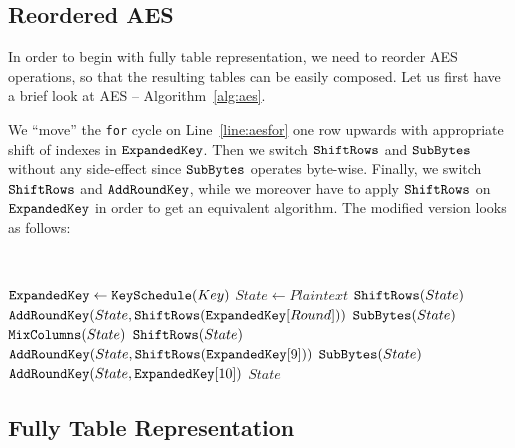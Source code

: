 
\subsection{Reordered AES}

In order to begin with fully table representation, we need to reorder AES operations, so that the resulting tables can be easily composed. Let us first have a brief look at AES -- Algorithm~\ref{alg:aes}.

We ``move'' the {\tt for} cycle on Line~\ref{line:aesfor} one row upwards with appropriate shift of indexes in $\texttt{ExpandedKey}$. Then we switch $\texttt{ShiftRows}$ and $\texttt{SubBytes}$ without any side-effect since $\texttt{SubBytes}$ operates byte-wise. Finally, we switch $\texttt{ShiftRows}$ and $\texttt{AddRoundKey}$, while we moreover have to apply $\texttt{ShiftRows}$ on $\texttt{ExpandedKey}$ in order to get an equivalent algorithm. The modified version looks as follows:
\begin{alg}
\label{alg:reordaes}
	~
	\begin{algorithmic}[1]
			\State $\texttt{ExpandedKey} \gets \texttt{KeySchedule}(Key)$
			\State $State \gets Plaintext$
				\State $\texttt{ShiftRows}(State)$
				\State $\texttt{AddRoundKey}(State, \texttt{ShiftRows}(\texttt{ExpandedKey}[Round]))$
				\State $\texttt{SubBytes}(State)$
				\State $\texttt{MixColumns}(State)$
			\EndFor
			\State $\texttt{ShiftRows}(State)$
			\State $\texttt{AddRoundKey}(State, \texttt{ShiftRows}(\texttt{ExpandedKey}[9]))$
			\State $\texttt{SubBytes}(State)$
			\State $\texttt{AddRoundKey}(State, \texttt{ExpandedKey}[10])$
			\State\Return $State$
		\EndFunction
	\end{algorithmic}
\end{alg}



\newpage   %

\subsection{Fully Table Representation}

